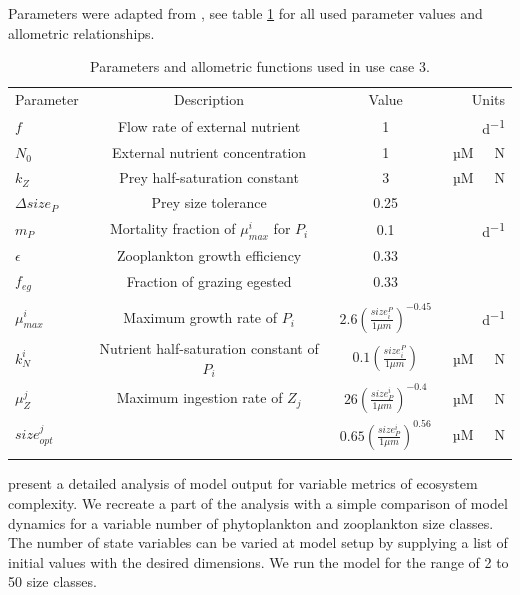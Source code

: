 \documentclass[journal abbreviation, manuscript]{copernicus}
\begin{document}
Parameters were adapted from \citet{Banas2011b}, see table \ref{Table:usecase3parameters} for all used parameter values and allometric relationships.
\begin{table}[t]
\caption{Parameters and allometric functions used in use case 3.}
\begin{tabular}{l c c r}
Parameter & Description & Value & Units \\
\tophline
$f$ & Flow rate of external nutrient & 1 & \unit{d^{-1}} \\
$N_0$ & External nutrient concentration & 1 & \unit{µM \ N} \\
$k_Z$ & Prey half-saturation constant & 3 & \unit{µM \ N}\\
$\Delta size_{P}$ & Prey size tolerance & 0.25 &  \\
$m_P$ & Mortality fraction of $\mu_{max}^i$ for $P_i$ & 0.1 & \unit{d^{-1}}\\
$\epsilon$ & Zooplankton growth efficiency & 0.33 & \\
$f_{eg}$ & Fraction of grazing egested & 0.33 & \\
\\

$\mu_{max}^i$ & Maximum growth rate of $P_i$ & $ 2.6 \left( \frac{size_i^{P}}{1\mu m} \right)^{-0.45}$  & \unit{d^{-1}} \\
$k_N^i$ & Nutrient half-saturation constant of $P_i$ & $ 0.1 \left( \frac{size_i^{P}}{1\mu m} \right)$ & \unit{µM \ N} \\

$\mu_Z^j$ & Maximum ingestion rate of $Z_j$ & $26 \left( \frac{size^i_{P}}{1\mu m} \right)^{-0.4}$ &\unit{µM \ N} \\

$size_{opt}^j$ &  & $0.65 \left( \frac{size_{P}^i}{1\mu m} \right)^{0.56}$ & \ \unit{µM \ N} \\

\bottomhline
\end{tabular}
\label{Table:usecase3parameters}
\end{table}
%

\citet{Banas2011b} present a detailed analysis of model output for variable metrics of ecosystem complexity. We recreate a part of the analysis with a simple comparison of model dynamics for a variable number of phytoplankton and zooplankton size classes. The number of state variables can be varied at model setup by supplying a list of initial values with the desired dimensions. We run the model for the range of 2 to 50 size classes.
\end{document}
